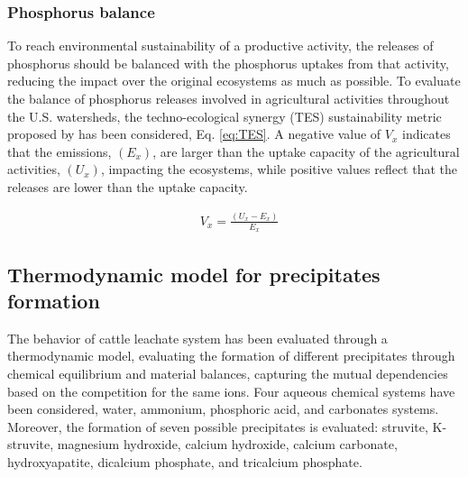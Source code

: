 \documentclass[10pt,a4paper]{article}
\begin{document}
\subsubsection{Phosphorus balance}
To reach environmental sustainability of a productive activity, the releases of phosphorus should be balanced with the phosphorus uptakes from that activity, reducing the impact over the original ecosystems as much as possible. To evaluate the balance of phosphorus releases involved in agricultural activities throughout the U.S. watersheds, the techno-ecological synergy (TES) sustainability metric proposed by  has been considered, Eq. \ref{eq:TES}. A negative value of $V_{x}$ indicates that the emissions, $\left(E_{x}\right)$, are larger than the uptake capacity of the agricultural activities, $\left(U_{x}\right)$, impacting the ecosystems, while positive values reflect that the releases are lower than the uptake capacity.

\begin{align}
& V_{x} =\frac{\left(U_{x} - E_{x}\right)}{E_{x}} \label{eq:TES}
\end{align}

\subsection{Thermodynamic model for precipitates formation} \label{thermo_model}
The behavior of cattle leachate system has been evaluated through a thermodynamic model, evaluating the formation of different precipitates through chemical equilibrium and material balances, capturing the mutual dependencies based on the competition for the same ions. Four aqueous chemical systems have been considered, water, ammonium, phosphoric acid, and carbonates systems. Moreover, the formation of seven possible precipitates is evaluated: struvite, K-struvite, magnesium hydroxide, calcium hydroxide, calcium carbonate, hydroxyapatite, dicalcium phosphate, and tricalcium phosphate.
\end{document}

